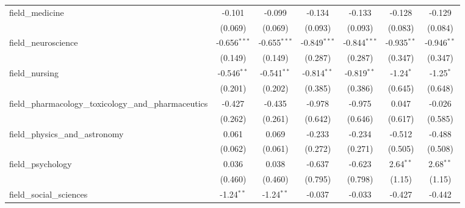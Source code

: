 \begin{tabular}{lcccccc}
   field\_medicine                                             & -0.101         & -0.099         & -0.134         & -0.133         & -0.128        & -0.129\\   
                                                               & (0.069)        & (0.069)        & (0.093)        & (0.093)        & (0.083)       & (0.084)\\   
   field\_neuroscience                                         & -0.656$^{***}$ & -0.655$^{***}$ & -0.849$^{***}$ & -0.844$^{***}$ & -0.935$^{**}$ & -0.946$^{**}$\\   
                                                               & (0.149)        & (0.149)        & (0.287)        & (0.287)        & (0.347)       & (0.347)\\   
   field\_nursing                                              & -0.546$^{**}$  & -0.541$^{**}$  & -0.814$^{**}$  & -0.819$^{**}$  & -1.24$^{*}$   & -1.25$^{*}$\\   
                                                               & (0.201)        & (0.202)        & (0.385)        & (0.386)        & (0.645)       & (0.648)\\   
   field\_pharmacology\_toxicology\_and\_pharmaceutics         & -0.427         & -0.435         & -0.978         & -0.975         & 0.047         & -0.026\\   
                                                               & (0.262)        & (0.261)        & (0.642)        & (0.646)        & (0.617)       & (0.585)\\   
   field\_physics\_and\_astronomy                              & 0.061          & 0.069          & -0.233         & -0.234         & -0.512        & -0.488\\   
                                                               & (0.062)        & (0.061)        & (0.272)        & (0.271)        & (0.505)       & (0.508)\\   
   field\_psychology                                           & 0.036          & 0.038          & -0.637         & -0.623         & 2.64$^{**}$   & 2.68$^{**}$\\   
                                                               & (0.460)        & (0.460)        & (0.795)        & (0.798)        & (1.15)        & (1.15)\\   
   field\_social\_sciences                                     & -1.24$^{**}$   & -1.24$^{**}$   & -0.037         & -0.033         & -0.427        & -0.442\\   

\end{tabular}

